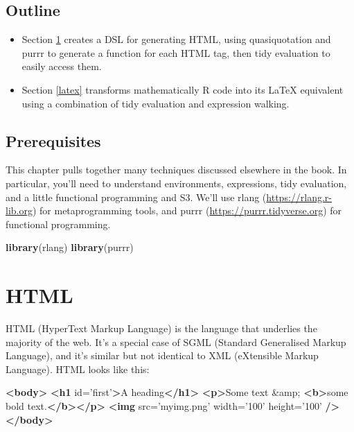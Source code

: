 \documentclass[]{book}
\newenvironment{Shaded}{\begin{snugshade}}{\end{snugshade}}
\newcommand{\DecValTok}[1]{\textcolor[rgb]{0.06,0.06,0.06}{#1}}
\newcommand{\KeywordTok}[1]{\textcolor[rgb]{0.27,0.27,0.27}{\textbf{#1}}}
\newcommand{\NormalTok}[1]{#1}
\newcommand{\OtherTok}[1]{\textcolor[rgb]{0.37,0.37,0.37}{#1}}
\newcommand{\StringTok}[1]{\textcolor[rgb]{0.5,0.5,0.5}{#1}}
\renewcommand{\href}[2]{#2 (\url{#1})}
\begin{document}
\hypertarget{outline-4}{%
\subsection*{Outline}\label{outline-4}}

\begin{itemize}
\item
  Section \ref{html} creates a DSL for generating HTML, using quasiquotation
  and purrr to generate a function for each HTML tag, then tidy evaluation to
  easily access them.
\item
  Section \ref{latex} transforms mathematically R code into its LaTeX
  equivalent using a combination of tidy evaluation and expression walking.
\end{itemize}

\hypertarget{prerequisites-4}{%
\subsection*{Prerequisites}\label{prerequisites-4}}

This chapter pulls together many techniques discussed elsewhere in the book. In particular, you'll need to understand environments, expressions, tidy evaluation, and a little functional programming and S3. We'll use \href{https://rlang.r-lib.org}{rlang} for metaprogramming tools, and \href{https://purrr.tidyverse.org}{purrr} for functional programming.

\begin{Shaded}
\begin{Highlighting}[]
\KeywordTok{library}\NormalTok{(rlang)}
\KeywordTok{library}\NormalTok{(purrr)}
\end{Highlighting}
\end{Shaded}

\hypertarget{html}{%
\section{HTML}\label{html}}


HTML (HyperText Markup Language) is the language that underlies the majority of the web. It's a special case of SGML (Standard Generalised Markup Language), and it's similar but not identical to XML (eXtensible Markup Language). HTML looks like this:

\begin{Shaded}
\begin{Highlighting}[]
\KeywordTok{<body>}
  \KeywordTok{<h1}\OtherTok{ id=}\StringTok{'first'}\KeywordTok{>}\NormalTok{A heading}\KeywordTok{</h1>}
  \KeywordTok{<p>}\NormalTok{Some text }\DecValTok{&amp;} \KeywordTok{<b>}\NormalTok{some bold text.}\KeywordTok{</b></p>}
  \KeywordTok{<img}\OtherTok{ src=}\StringTok{'myimg.png'}\OtherTok{ width=}\StringTok{'100'}\OtherTok{ height=}\StringTok{'100'} \KeywordTok{/>}
\KeywordTok{</body>}
\end{Highlighting}
\end{Shaded}
\end{document}
